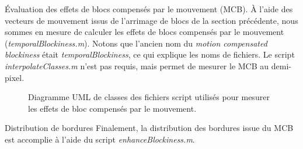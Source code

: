 \begin{section}{Évaluation des effets de blocs compensés par le mouvement
(MCB).} À l'aide des vecteurs de mouvement issus de l'arrimage de blocs de la
section précédente, nous sommes en mesure de calculer les effets de blocs
compensés par le mouvement (\textit{temporalBlockiness.m}). Notons que l'ancien
nom du \textit{motion compensated blockiness} était \textit{temporalBlockiness},
ce qui explique les noms de fichiers. Le script \textit{interpolateClasses.m}
n'est pas requis, mais permet de mesurer le MCB au demi-pixel.
\begin{figure}
	\caption{Diagramme UML de classes des fichiers script utilisés pour mesurer
	les effets de bloc compensés par le mouvement.}
	\label{fig-BlockMatchingUML}
\end{figure}
\FloatBarrier

\newpage



\newpage

\end{section}

\newpage

\begin{section}{Distribution de bordures}
Finalement, la distribution des bordures issue du MCB est accomplie à l'aide du
script \textit{enhanceBlockiness.m}.

\end{section}